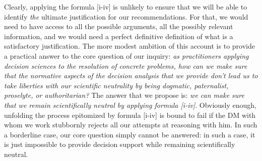 \documentclass[preprint, french, english, 11pt, authoryear]{elsarticle}%
\begin{document}
Clearly, applying the formula [i-iv] is unlikely to ensure that we will be able to identify \emph{the} ultimate justification for our recommendations. For that, we would need to have access to all the possible arguments, all the possibly relevant information, and we would need a perfect definitive definition of what is a satisfactory justification.  The more modest ambition of this account is to provide a practical answer to the core question of our inquiry: \emph{as practitioners applying decision sciences to the resolution of concrete problems, how can we make sure that the normative aspects of the decision analysis that we provide don't lead us to take liberties with our scientific neutrality by being dogmatic, paternalist, proselyte, or authoritarian?} The answer that we propose is: \emph{we can make sure that we remain scientifically neutral by applying formula [i-iv]}. Obviously enough, unfolding the process epitomized by formula [i-iv] is bound to fail if the \ac{DM} with whom we work stubbornly rejects all our attempts at reasoning with him. In such a borderline case, our core question simply cannot be answered: in such a case, it is just impossible to provide decision support while remaining scientifically neutral.
\end{document}
